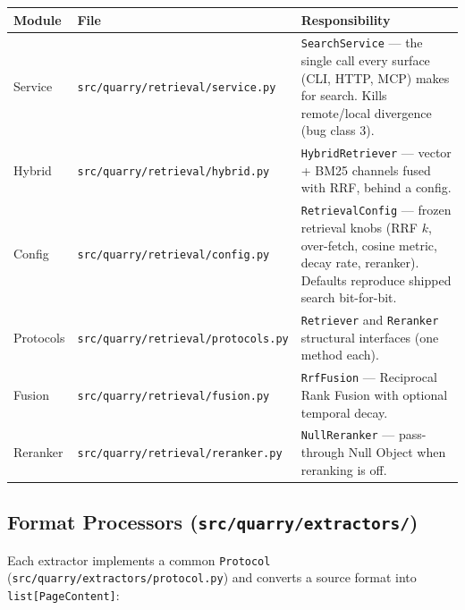 \documentclass[a4paper,10pt]{article}
\newcommand{\modpath}[1]{\texttt{src/quarry/#1}}
\begin{document}
\begin{center}
\begin{tabular}{llp{7cm}}
\toprule
\textbf{Module} & \textbf{File} & \textbf{Responsibility} \\
\midrule
Service    & \modpath{retrieval/service.py}   & \texttt{SearchService}
             --- the single call every surface (CLI, HTTP, MCP) makes
             for search.  Kills remote/local divergence (bug class 3). \\
Hybrid     & \modpath{retrieval/hybrid.py}    & \texttt{HybridRetriever}
             --- vector + BM25 channels fused with RRF, behind a
             config. \\
Config     & \modpath{retrieval/config.py}    & \texttt{RetrievalConfig}
             --- frozen retrieval knobs (RRF $k$, over-fetch, cosine
             metric, decay rate, reranker).  Defaults reproduce shipped
             search bit-for-bit. \\
Protocols  & \modpath{retrieval/protocols.py} & \texttt{Retriever} and
             \texttt{Reranker} structural interfaces (one method
             each). \\
Fusion     & \modpath{retrieval/fusion.py}    & \texttt{RrfFusion} ---
             Reciprocal Rank Fusion with optional temporal decay. \\
Reranker   & \modpath{retrieval/reranker.py}  & \texttt{NullReranker}
             --- pass-through Null Object when reranking is off. \\
\bottomrule
\end{tabular}
\end{center}

\subsection{Format Processors (\modpath{extractors/})}

Each extractor implements a common \texttt{Protocol}
(\modpath{extractors/protocol.py}) and converts a source format into
\texttt{list[PageContent]}:
\end{document}
